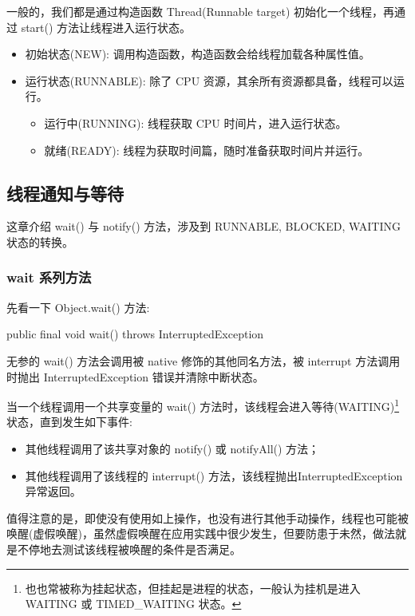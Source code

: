 一般的，我们都是通过构造函数 Thread(Runnable target) 初始化一个线程，再通过 start() 方法让线程进入运行状态。
\begin{itemize}
    \item 初始状态(NEW): 调用构造函数，构造函数会给线程加载各种属性值。
    \item 运行状态(RUNNABLE): 除了 CPU 资源，其余所有资源都具备，线程可以运行。
    \begin{itemize}
        \item 运行中(RUNNING): 线程获取 CPU 时间片，进入运行状态。
        \item 就绪(READY): 线程为获取时间篇，随时准备获取时间片并运行。
    \end{itemize}
\end{itemize}

\subsection{线程通知与等待}

这章介绍 wait() 与 notify() 方法，涉及到 RUNNABLE, BLOCKED, WAITING 状态的转换。

\subsubsection{wait 系列方法}

先看一下 Object.wait() 方法:

\begin{Java}
public final void wait() throws InterruptedException
\end{Java}

无参的 wait() 方法会调用被 native 修饰的其他同名方法，被 interrupt 方法调用时抛出 InterruptedException 错误并清除中断状态。

当一个线程调用一个共享变量的 wait() 方法时，该线程会进入等待(WAITING)\footnote{也也常被称为挂起状态，但挂起是进程的状态，一般认为挂机是进入 WAITING 或 TIMED\_WAITING 状态。}状态，直到发生如下事件:
\begin{itemize}
    \item 其他线程调用了该共享对象的 notify() 或 notifyAll() 方法；
    \item 其他线程调用了该线程的 interrupt() 方法，该线程抛出InterruptedException异常返回。
\end{itemize} 

值得注意的是，即使没有使用如上操作，也没有进行其他手动操作，线程也可能被唤醒(虚假唤醒)，虽然虚假唤醒在应用实践中很少发生，但要防患于未然，做法就是不停地去测试该线程被唤醒的条件是否满足。

